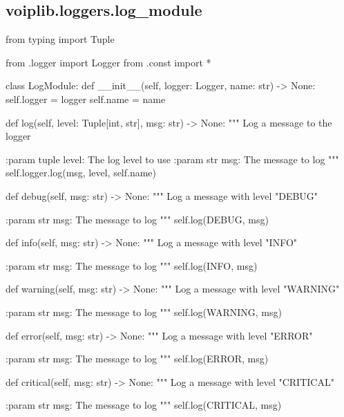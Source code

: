 \subsection{voiplib.loggers.log\_module}
\begin{pythoncode}
from typing import Tuple

from .logger import Logger
from .const import *


class LogModule:
    def __init__(self, logger: Logger, name: str) -> None:
        self.logger = logger
        self.name = name

    def log(self, level: Tuple[int, str], msg: str) -> None:
        """
        Log a message to the logger

        :param tuple level: The log level to use
        :param str msg: The message to log
        """
        self.logger.log(msg, level, self.name)

    def debug(self, msg: str) -> None:
        """
        Log a message with level "DEBUG"

        :param str msg: The message to log
        """
        self.log(DEBUG, msg)

    def info(self, msg: str) -> None:
        """
        Log a message with level "INFO"

        :param str msg: The message to log
        """
        self.log(INFO, msg)

    def warning(self, msg: str) -> None:
        """
        Log a message with level "WARNING"

        :param str msg: The message to log
        """
        self.log(WARNING, msg)

    def error(self, msg: str) -> None:
        """
        Log a message with level "ERROR"

        :param str msg: The message to log
        """
        self.log(ERROR, msg)

    def critical(self, msg: str) -> None:
        """
        Log a message with level "CRITICAL"

        :param str msg: The message to log
        """
        self.log(CRITICAL, msg)
\end{pythoncode}

